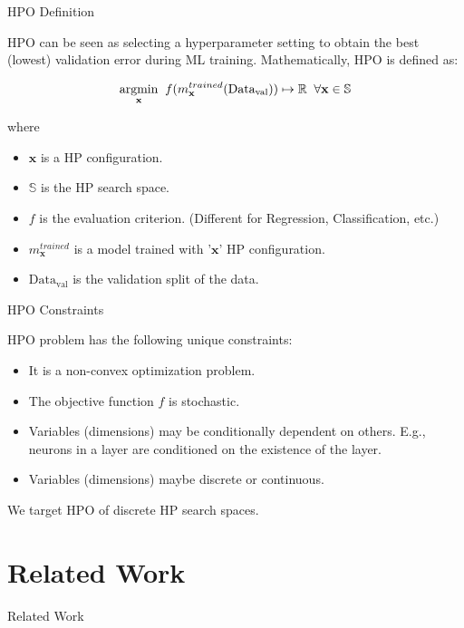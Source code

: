 \documentclass{beamer}
\begin{document}
\begin{frame}[t]{HPO Definition}

HPO can be seen as selecting a hyperparameter setting to obtain the best (lowest) validation error during ML training.
Mathematically,  HPO is defined as:

$$
\underset{\rm \textbf{x}}{\rm argmin} \;\; f(m^{trained}_{\textbf{x}}(\textrm{Data}_{\textrm{val}})) \mapsto \mathbb{R}  \;\;  \forall \textbf{x} \in \mathbb{S}
$$

where
\begin{itemize}
\item $\textbf{x}$ is a HP configuration.
\item $\mathbb{S}$ is the HP search space.
\item $f$ is the evaluation criterion. (Different for Regression,  Classification, etc.)
\item $m^{trained}_{\textbf{x}}$ is a model trained with '$\textbf{x}$' HP configuration.
\item $\textrm{Data}_{\textrm{val}}$ is the validation split of the data.
\end{itemize}

\end{frame}

\begin{frame}[t]{HPO Constraints}

HPO problem has the following unique constraints:

\begin{itemize}
\item It is a non-convex optimization problem.
\item The objective function $f$ is stochastic.
\item Variables (dimensions) may be conditionally dependent on others. E.g.,  neurons in a layer are conditioned on the existence of the layer.
\item Variables (dimensions) maybe discrete or continuous.
\end{itemize}

We target HPO of discrete HP search spaces.

\end{frame}

\section{Related Work}

\begin{frame}

\centering
\LARGE{Related Work}

\end{frame}
\end{document}
